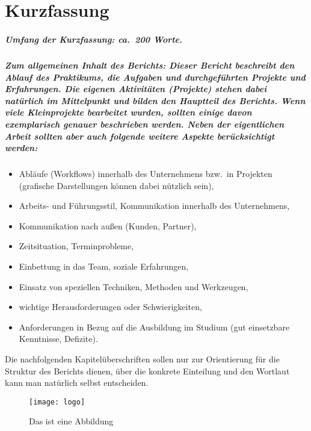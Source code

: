 \chapter{Kurzfassung}
\label{cha:Kurzfassung}

\paragraph{Umfang der Kurzfassung: ca.\ 200 Worte.}

\paragraph{Zum allgemeinen Inhalt des Berichts: \emph{Dieser Bericht beschreibt den Ablauf des Praktikums}, die \textbf{Aufgaben und durchgeführten Projekte} und Erfahrungen. Die eigenen Aktivitäten (Projekte) stehen dabei natürlich im Mittelpunkt und bilden den Hauptteil des Berichts. Wenn viele Kleinprojekte bearbeitet wurden, sollten einige davon exemplarisch genauer beschrieben werden. Neben der eigentlichen Arbeit sollten aber auch folgende weitere Aspekte berücksichtigt werden:}
%
\begin{itemize}
	\item Abläufe (Workflows) innerhalb des Unternehmens bzw.\ in Projekten
	(grafische Darstellungen können dabei nützlich sein),
	\item Arbeits- und Führungsstil, Kommunikation innerhalb des Unternehmens,
	\item Kommunikation nach außen (Kunden, Partner),
	\item Zeitsituation, Terminprobleme,
	\item Einbettung in das Team, soziale Erfahrungen,
	\item Einsatz von speziellen Techniken, Methoden und Werkzeugen,
	\item wichtige Herausforderungen oder Schwierigkeiten,
	\item Anforderungen in Bezug auf die Ausbildung im Studium (gut
	einsetzbare Kenntnisse, Defizite).
\end{itemize}
%
Die nachfolgenden Kapitelüberschriften sollen nur zur Orientierung für die
Struktur des Berichts dienen, über die konkrete Einteilung und den Wortlaut
kann man natürlich selbst entscheiden.

\begin{figure}[htbp] 
    \centering
    \texttt{[image: logo]}
    \caption{Das ist eine Abbildung}
    \label{fig:pic1}
\end{figure}